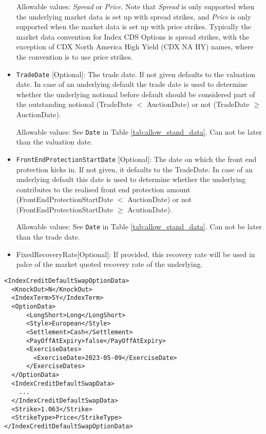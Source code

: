 \begin{itemize}
Allowable values: \emph{Spread} or \emph{Price}. Note that \emph{Spread} is only supported when the underlying market data is set up with spread strikes, and \emph{Price} is only supported when the market data is set up with price strikes. Typically the market data convention for Index CDS Options is spread strikes, with the exception of CDX North America High Yield (CDX NA HY) names, where the convention is to use price strikes.

\item 
\lstinline!TradeDate! [Optional]: The trade date. If not given defaults to the valuation date. In case of an underlying
default the trade date is used to determine whether the underlying notional before default should be considered part of
the outstanding notional (TradeDate $<$ AuctionDate) or not (TradeDate $\geq$ AuctionDate).
 
Allowable values: See \lstinline!Date! in Table \ref{tab:allow_stand_data}. Can not be later than the valuation date.
 
\item 
\lstinline!FrontEndProtectionStartDate! [Optional]: The date on which the front end protection kicks in. If not given,
it defaults to the TradeDate. In case of an underlying default this date is used to determine whether the underlying
contributes to the realised front end protection amount (FrontEndProtectionStartDate $<$ AuctionDate) or not
(FrontEndProtectionStartDate $\geq$ AcutionDate).
 
Allowable values: See \lstinline!Date! in Table \ref{tab:allow_stand_data}. Can not be later than the trade date.
 
\item FixedRecoveryRate[Optional]: If provided, this recovery rate will be used in palce of the market quoted recovery rate of the underlying.
  
\end{itemize}

\begin{listing}[H]
\begin{verbatim}
<IndexCreditDefaultSwapOptionData>
  <KnockOut>N</KnockOut>
  <IndexTerm>5Y</IndexTerm>
  <OptionData>
      <LongShort>Long</LongShort>
      <Style>European</Style>
      <Settlement>Cash</Settlement>
      <PayOffAtExpiry>false</PayOffAtExpiry>
      <ExerciseDates>
        <ExerciseDate>2023-05-09</ExerciseDate>
      </ExerciseDates>
  </OptionData>
  <IndexCreditDefaultSwapData>
    ... 
  </IndexCreditDefaultSwapData>
  <Strike>1.063</Strike>
  <StrikeType>Price</StrikeType>
</IndexCreditDefaultSwapOptionData>
\end{verbatim}
\caption{Example Structure of \lstinline!IndexCreditDefaultSwapOptionData! node.}
\label{lst:indexcdsoptiondata}
\end{listing}

